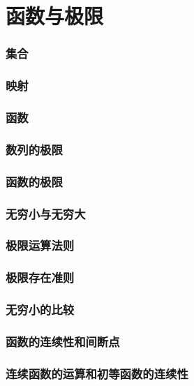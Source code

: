 \documentclass{article}
\begin{document}
  \tableofcontents

  \newpage
  \part{函数与极限}
  \section{集合}
    
  \section{映射}
    
  \section{函数}
    
  \section{数列的极限}
    
  \section{函数的极限}
    
  \section{无穷小与无穷大}
    
  \section{极限运算法则}
    
  \section{极限存在准则}
    
  \section{无穷小的比较}
    
  \section{函数的连续性和间断点}
    
  \section{连续函数的运算和初等函数的连续性}
    
\end{document}
